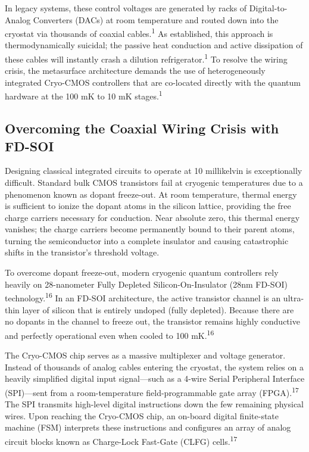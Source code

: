 \documentclass[11pt, a4paper]{article}
\begin{document}
In legacy systems, these control voltages are generated by racks of Digital-to-Analog Converters (DACs) at room temperature and routed down into the cryostat via thousands of coaxial cables.\textsuperscript{1} As established, this approach is thermodynamically suicidal; the passive heat conduction and active dissipation of these cables will instantly crash a dilution refrigerator.\textsuperscript{1} To resolve the wiring crisis, the metasurface architecture demands the use of heterogeneously integrated Cryo-CMOS controllers that are co-located directly with the quantum hardware at the 100 mK to 10 mK stages.\textsuperscript{1}

\subsection*{Overcoming the Coaxial Wiring Crisis with FD-SOI}

Designing classical integrated circuits to operate at 10 millikelvin is exceptionally difficult. Standard bulk CMOS transistors fail at cryogenic temperatures due to a phenomenon known as dopant freeze-out. At room temperature, thermal energy is sufficient to ionize the dopant atoms in the silicon lattice, providing the free charge carriers necessary for conduction. Near absolute zero, this thermal energy vanishes; the charge carriers become permanently bound to their parent atoms, turning the semiconductor into a complete insulator and causing catastrophic shifts in the transistor's threshold voltage.

To overcome dopant freeze-out, modern cryogenic quantum controllers rely heavily on 28-nanometer Fully Depleted Silicon-On-Insulator (28nm FD-SOI) technology.\textsuperscript{16} In an FD-SOI architecture, the active transistor channel is an ultra-thin layer of silicon that is entirely undoped (fully depleted). Because there are no dopants in the channel to freeze out, the transistor remains highly conductive and perfectly operational even when cooled to 100 mK.\textsuperscript{16}

The Cryo-CMOS chip serves as a massive multiplexer and voltage generator. Instead of thousands of analog cables entering the cryostat, the system relies on a heavily simplified digital input signal---such as a 4-wire Serial Peripheral Interface (SPI)---sent from a room-temperature field-programmable gate array (FPGA).\textsuperscript{17} The SPI transmits high-level digital instructions down the few remaining physical wires. Upon reaching the Cryo-CMOS chip, an on-board digital finite-state machine (FSM) interprets these instructions and configures an array of analog circuit blocks known as Charge-Lock Fast-Gate (CLFG) cells.\textsuperscript{17}
\end{document}
